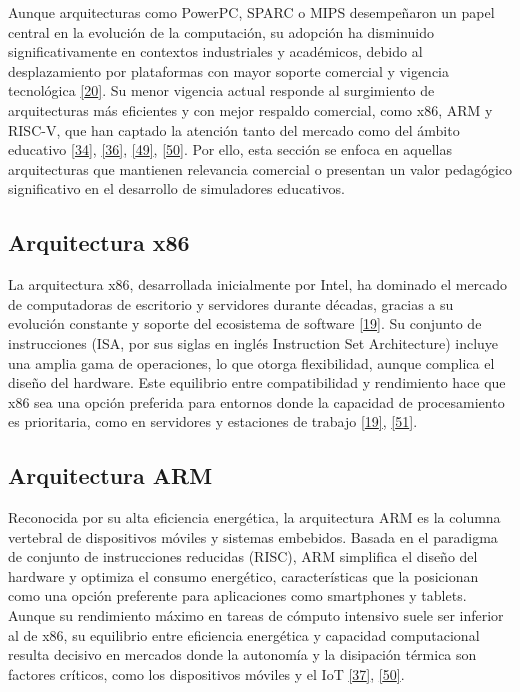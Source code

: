 \documentclass[12pt,oneside]{templates/unerthesis}
\begin{document}
Aunque arquitecturas como PowerPC, SPARC o MIPS desempeñaron un papel central en la evolución de la computación, su adopción ha disminuido significativamente en contextos industriales y académicos, debido al desplazamiento por plataformas con mayor soporte comercial y vigencia tecnológica \protect\hyperlink{ref-stallings_computer_2021}{{[}20{]}}. Su menor vigencia actual responde al surgimiento de arquitecturas más eficientes y con mejor respaldo comercial, como x86, ARM y RISC-V, que han captado la atención tanto del mercado como del ámbito educativo \protect\hyperlink{ref-waterman_risc-v_2014}{{[}34{]}}, \protect\hyperlink{ref-null_essentials_2023}{{[}36{]}}, \protect\hyperlink{ref-hennessy2017computer_riscv}{{[}49{]}}, \protect\hyperlink{ref-arm_evolution_2025}{{[}50{]}}. Por ello, esta sección se enfoca en aquellas arquitecturas que mantienen relevancia comercial o presentan un valor pedagógico significativo en el desarrollo de simuladores educativos.

\hypertarget{x86}{%
\subsection{Arquitectura x86}\label{x86}}

La arquitectura x86, desarrollada inicialmente por Intel, ha dominado el mercado de computadoras de escritorio y servidores durante décadas, gracias a su evolución constante y soporte del ecosistema de software \protect\hyperlink{ref-hennessy2017computer}{{[}19{]}}. Su conjunto de instrucciones (ISA, por sus siglas en inglés Instruction Set Architecture) incluye una amplia gama de operaciones, lo que otorga flexibilidad, aunque complica el diseño del hardware. Este equilibrio entre compatibilidad y rendimiento hace que x86 sea una opción preferida para entornos donde la capacidad de procesamiento es prioritaria, como en servidores y estaciones de trabajo \protect\hyperlink{ref-hennessy2017computer}{{[}19{]}}, \protect\hyperlink{ref-intel_whitepaper_2023}{{[}51{]}}.

\hypertarget{arquitectura-arm}{%
\subsection{Arquitectura ARM}\label{arquitectura-arm}}

Reconocida por su alta eficiencia energética, la arquitectura ARM es la columna vertebral de dispositivos móviles y sistemas embebidos. Basada en el paradigma de conjunto de instrucciones reducidas (RISC), ARM simplifica el diseño del hardware y optimiza el consumo energético, características que la posicionan como una opción preferente para aplicaciones como smartphones y tablets. Aunque su rendimiento máximo en tareas de cómputo intensivo suele ser inferior al de x86, su equilibrio entre eficiencia energética y capacidad computacional resulta decisivo en mercados donde la autonomía y la disipación térmica son factores críticos, como los dispositivos móviles y el IoT \protect\hyperlink{ref-patterson_computer_2014}{{[}37{]}}, \protect\hyperlink{ref-arm_evolution_2025}{{[}50{]}}.
\end{document}
